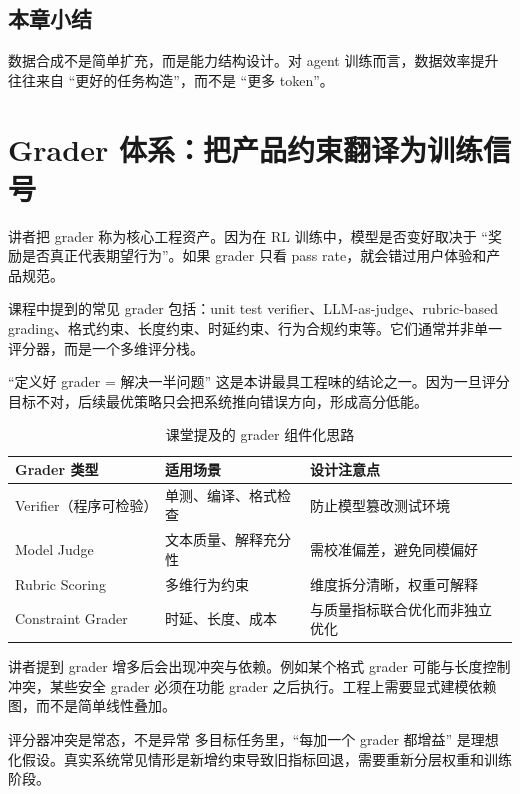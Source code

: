 \documentclass[a4paper]{article}
\begin{document}
\subsection{本章小结}
数据合成不是简单扩充，而是能力结构设计。对 agent 训练而言，数据效率提升往往来自 ``更好的任务构造''，而不是 ``更多 token''。

\section{Grader 体系：把产品约束翻译为训练信号}

讲者把 grader 称为核心工程资产。因为在 RL 训练中，模型是否变好取决于 ``奖励是否真正代表期望行为''。如果 grader 只看 pass rate，就会错过用户体验和产品规范。

课程中提到的常见 grader 包括：unit test verifier、LLM-as-judge、rubric-based grading、格式约束、长度约束、时延约束、行为合规约束等。它们通常并非单一评分器，而是一个多维评分栈。

\begin{importantbox}{``定义好 grader = 解决一半问题''}
这是本讲最具工程味的结论之一。因为一旦评分目标不对，后续最优策略只会把系统推向错误方向，形成高分低能。
\end{importantbox}

\begin{table}[H]
\centering
\begin{tabular}{p{2.5cm}p{3.2cm}p{4.8cm}}
\toprule
\textbf{Grader 类型} & \textbf{适用场景} & \textbf{设计注意点} \\
\midrule
Verifier（程序可检验） & 单测、编译、格式检查 & 防止模型篡改测试环境 \\
Model Judge & 文本质量、解释充分性 & 需校准偏差，避免同模偏好 \\
Rubric Scoring & 多维行为约束 & 维度拆分清晰，权重可解释 \\
Constraint Grader & 时延、长度、成本 & 与质量指标联合优化而非独立优化 \\
\bottomrule
\end{tabular}
\caption{课堂提及的 grader 组件化思路}
\end{table}

讲者提到 grader 增多后会出现冲突与依赖。例如某个格式 grader 可能与长度控制冲突，某些安全 grader 必须在功能 grader 之后执行。工程上需要显式建模依赖图，而不是简单线性叠加。

\begin{warningbox}{评分器冲突是常态，不是异常}
多目标任务里，``每加一个 grader 都增益'' 是理想化假设。真实系统常见情形是新增约束导致旧指标回退，需要重新分层权重和训练阶段。
\end{warningbox}
\end{document}
